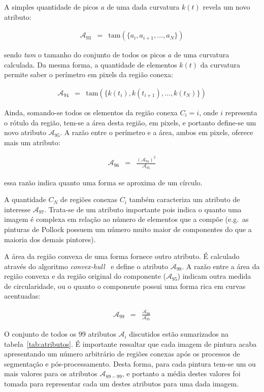 A simples quantidade de picos $a$ de uma dada curvatura $k(t)$ revela um novo
atributo:

\begin{eqnarray}
  \mathcal{A}_{93} & = & \text{tam}(\{a_{i}, a_{i+1}, ..., a_{N}\})
\end{eqnarray}

\noindent sendo \textit{tam} o tamanho do conjunto de todos os picos $a$ de uma
curvatura calculada. Da mesma forma, a quantidade de elementos $k(t)$ da
curvatura permite saber o perímetro em pixels da região conexa:

\begin{eqnarray}
  \mathcal{A}_{94} & = & \text{tam}(\{k(t_{i}), k(t_{i+1}), ..., k(t_{N})\})
\end{eqnarray}

Ainda, somando-se todos os elementos da região conexa $C_i = i$, onde $i$
representa o rótulo da região, tem-se a área desta região, em pixels, e portanto
define-se um novo atributo $\mathcal{A}_{95}$. A razão entre o perímetro e a
área, ambos em pixels, oferece mais um atributo:

\begin{eqnarray}
  \mathcal{A}_{96} & = & \frac{(\mathcal{A}_{94})^2}{\mathcal{A}_{95}}
\end{eqnarray}

\noindent essa razão indica quanto uma forma se aproxima de um círculo.

A quantidade $C_N$ de regiões conexas $C_i$ também caracteriza um atributo de
interesse $\mathcal{A}_{97}$. Trata-se de um atributo importante pois indica o
quanto uma imagem é complexa em relação ao número de elementos que a compõe
(e.g.\ as pinturas de Pollock possuem um número muito maior de componentes do
que a maioria dos demais pintores).

A área da região convexa de uma forma fornece outro atributo. É calculado
através do algoritmo \textit{convex-hull}~\cite{luciano} e define o atributo
$\mathcal{A}_{98}$. A razão entre a área da região convexa e da região original
do componente ($\mathcal{A}_{95}$) indicam outra medida de circularidade, ou o
quanto o componente possui uma forma rica em curvas acentuadas:

\begin{eqnarray}
  \mathcal{A}_{99} & = & \frac{\mathcal{A}_{98}}{\mathcal{A}_{95}}
\end{eqnarray}

O conjunto de todos os 99 atributos $\mathcal{A}_i$ discutidos estão sumarizados na
tabela~\ref{tab:atributos}. É importante ressaltar que cada imagem de pintura
acaba apresentando um número arbitrário de regiões conexas após os processos de
segmentação e pós-processamento. Desta forma, para cada pintura tem-se um ou
mais valores para os atributos $\mathcal{A}_{89-99}$, e portanto a média destes
valores foi tomada para representar cada um destes atributos para uma dada imagem.

